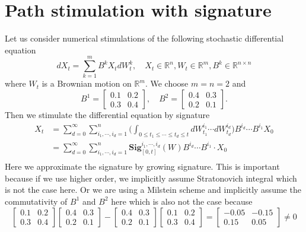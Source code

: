 \documentclass[12pt]{report}
\theoremstyle{definition}
\theoremstyle{remark}
\newcommand{\R}{\mathbb{R}}
\begin{document}
\section{Path stimulation with signature}
Let us consider numerical stimulations of the following stochastic differential equation
\begin{equation*}
  dX_t = \sum_{k=1}^{m} B^{k}X_{t}dW^{k}_{t},\quad X_{t}\in \mathbb{R}^{n}, W_{t}\in\mathbb{R}^{m}, B^{k} \in \mathbb{R}^{n\times n}
\end{equation*}
where $W_{t}$ is a Brownian motion on $\R^{m}$. We choose $m=n=2$ and 
\begin{equation*}
  B^{1} = \begin{bmatrix}
    0.1& 0.2\\
    0.3& 0.4
  \end{bmatrix},\quad 
  B^{2} = \begin{bmatrix}
    0.4& 0.3\\
    0.2& 0.1
  \end{bmatrix}.
\end{equation*}
Then we stimulate the differential equation by signature 
\begin{equation*}
  \begin{split}
    X_t &= \sum_{d = 0}^{\infty}\sum_{i_{1},\cdots,i_{d} = 1}^{n} \bigg(\int_{0\leq t_{1}\leq\cdots\leq t_{d}\leq t}dW^{i_{1}}_{t_{1}}\cdots dW^{i_{d}}_{t_{d}}\bigg)B^{i_{d}}\cdots B^{i_{1}} X_{0}\\
    &= \sum_{d = 0}^{\infty}\sum_{i_{1},\cdots,i_{d} = 1}^{n} \mathbf{Sig}^{i_{1},\cdots,i_{d}}_{[0,t]}(W) B^{i_{d}}\cdots B^{i_{1}} \cdot X_{0}\\
  \end{split}
\end{equation*}
Here we approximate the signature by growing signature. This is important because if we use higher order, we implicitly assume Stratonovich integral which is not the case here. Or we are using a Milstein scheme and implicitly assume the commutativity of $B^{1}$ and $B^{2}$ here which is also not the case because
\begin{equation*}
  \begin{bmatrix}
    0.1& 0.2\\
    0.3& 0.4
  \end{bmatrix}
  \begin{bmatrix}
    0.4& 0.3\\
    0.2& 0.1
  \end{bmatrix} 
  - 
  \begin{bmatrix}
    0.4& 0.3\\
    0.2& 0.1
  \end{bmatrix}
  \begin{bmatrix}
    0.1& 0.2\\
    0.3& 0.4
  \end{bmatrix}
  = 
  \begin{bmatrix}
    -0.05& -0.15\\
    0.15& 0.05
  \end{bmatrix} \neq 0
\end{equation*} 
\end{document}
